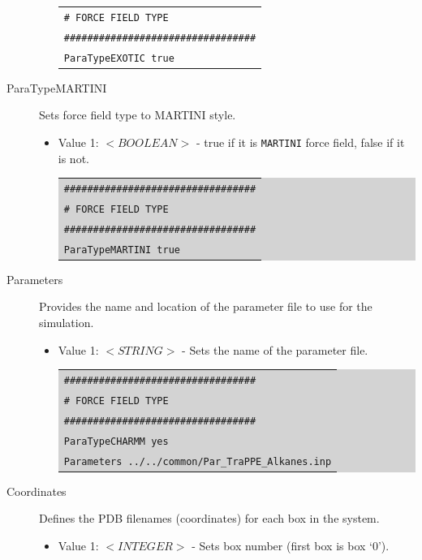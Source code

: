 \begin{description}
\begin{itemize}
{\begin{tabular}{l}
	\texttt{\# FORCE FIELD TYPE}\\
	\texttt{\#\#\#\#\#\#\#\#\#\#\#\#\#\#\#\#\#\#\#\#\#\#\#\#\#\#\#\#\#\#\#\#\#}\\
	\texttt{ParaTypeEXOTIC true}\\
	\end{tabular}}
	\end{itemize}
\item [ParaTypeMARTINI] Sets force field type to MARTINI style.
	\begin{itemize}	
	\item Value 1: $<BOOLEAN>$ - true if it is \texttt{MARTINI} force field, false if it is not.\\
	\colorbox{lightgray}{
	\begin{tabular}{l}
	\texttt{\#\#\#\#\#\#\#\#\#\#\#\#\#\#\#\#\#\#\#\#\#\#\#\#\#\#\#\#\#\#\#\#\#}\\
	\texttt{\# FORCE FIELD TYPE}\\
	\texttt{\#\#\#\#\#\#\#\#\#\#\#\#\#\#\#\#\#\#\#\#\#\#\#\#\#\#\#\#\#\#\#\#\#}\\
	\texttt{ParaTypeMARTINI true}\\
	\end{tabular}}
	\end{itemize}
\item [Parameters] Provides the name and location of the parameter file to use for the simulation.
	\begin{itemize}	
	\item Value 1: $<STRING>$ - Sets the name of the parameter file.\\
	\colorbox{lightgray}{
	\begin{tabular}{l}
	\texttt{\#\#\#\#\#\#\#\#\#\#\#\#\#\#\#\#\#\#\#\#\#\#\#\#\#\#\#\#\#\#\#\#\#}\\
	\texttt{\# FORCE FIELD TYPE}\\
	\texttt{\#\#\#\#\#\#\#\#\#\#\#\#\#\#\#\#\#\#\#\#\#\#\#\#\#\#\#\#\#\#\#\#\#}\\
	\texttt{ParaTypeCHARMM yes}\\
	\texttt{Parameters ../../common/Par\_TraPPE\_Alkanes.inp}\\
	\end{tabular}}
	\end{itemize}
\item [Coordinates] Defines the PDB filenames (coordinates) for each box in the system.
	\begin{itemize}	
	\item Value 1: $<INTEGER>$ - Sets box number (first box is box `0').\\

\end{itemize}
\end{description}
